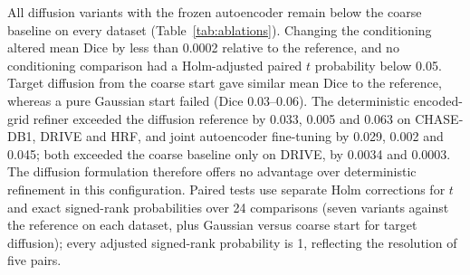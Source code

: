 \documentclass[jimaging,article,submit,pdftex,moreauthors]
  {Definitions/mdpi}
\newcommand{\revbegin}{\begingroup\color{blue}}
\newcommand{\revbegin}{\begingroup}
\newcommand{\revend}{\ifhmode\par\fi\endgroup}
\providecommand{\linelabel}[1]{}
\newcommand{\secend}[1]{\linelabel{rev:end:#1}}
\begin{document}
\begin{table}[htbp]\revbegin{}
\centering
\caption{Component ablations: stochastic modes use 50 DDIM updates; the deterministic control uses no DDIM and is evaluated once per image. Entries are mean Dice $\pm$ sample SD across five training-seed means, after averaging sampling realisations and test images. All rows share the coarse predictions in the first row.}
\label{tab:ablations}
\small
{}
\revend{}\end{table}

All diffusion variants with the frozen autoencoder remain below the coarse baseline on every dataset (Table~\ref{tab:ablations}). Changing the conditioning altered mean Dice by less than 0.0002 relative to the reference, and no conditioning comparison had a Holm-adjusted paired $t$ probability below 0.05. Target diffusion from the coarse start gave similar mean Dice to the reference, whereas a pure Gaussian start failed (Dice 0.03--0.06). The deterministic encoded-grid refiner exceeded the diffusion reference by 0.033, 0.005 and 0.063 on CHASE-DB1, DRIVE and HRF, and joint autoencoder fine-tuning by 0.029, 0.002 and 0.045; both exceeded the coarse baseline only on DRIVE, by 0.0034 and 0.0003. The diffusion formulation therefore offers no advantage over deterministic refinement in this configuration. Paired tests use separate Holm corrections for $t$ and exact signed-rank probabilities over 24 comparisons (seven variants against the reference on each dataset, plus Gaussian versus coarse start for target diffusion); every adjusted signed-rank probability is 1, reflecting the resolution of five pairs.\secend{ablations}\revend{}
\end{document}
